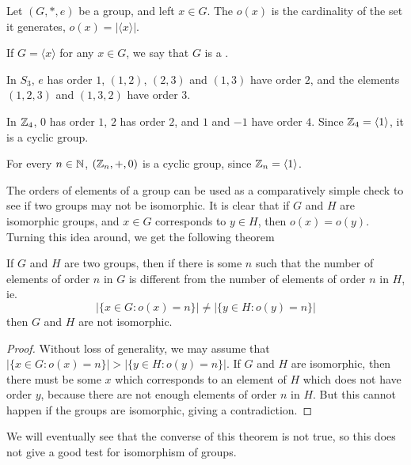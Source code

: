 \begin{definition}
  Let $(G, \ast, e)$ be a group, and left $x \in G$.  The
   $o(x)$ is the cardinality of the set it
  generates, $o(x) = |\langle x \rangle|$.
  
  If $G = \langle x \rangle$ for any $x \in G$, we say that $G$ is a
  .
\end{definition}

\begin{example}
  In $S_{3}$, $e$ has order $1$, $(1,2)$, $(2,3)$ and $(1,3)$ have order $2$,
  and the elements $(1,2,3)$ and $(1,3,2)$ have order $3$.
  
  In $\mathbb{Z}_{4}$, $0$ has order $1$, $2$ has order $2$, and $1$ and $-1$
  have order $4$.  Since $\mathbb{Z}_{4} = \langle 1 \rangle$, it is a cyclic
  group.
\end{example}

\begin{example}
  For every $n \in \mathbb{N}$, $(\mathbb{Z}_{n}, +, 0)$ is a cyclic group,
  since $\mathbb{Z}_{n} = \langle 1 \rangle$.
\end{example}

The orders of elements of a group can be used as a comparatively 
simple check to see if two groups may not be isomorphic.  It is clear 
that if $G$ and $H$ are isomorphic groups, and $x \in G$ corresponds to 
$y \in H$, then $o(x) = o(y)$.  Turning this idea around, we get the 
following theorem

\begin{theorem}
    If $G$ and $H$ are two groups, then if there is some $n$ such that
    the number of elements of order $n$ in $G$ is different from the
    number of elements of order $n$ in $H$, ie.
    \[
      |\{x \in G : o(x) = n\}| \ne |\{y \in H : o(y) = n\}|
    \]
    then $G$ and $H$ are not isomorphic.
\end{theorem}
\begin{proof}
    Without loss of generality, we may assume that $|\{x \in G : o(x) = 
    n\}| > |\{y \in H : o(y) = n\}|$.  If $G$ and $H$ are isomorphic, 
    then there must be some $x$ which corresponds to an element of $H$ 
    which does not have order $y$, because there are not enough 
    elements of order $n$ in $H$.  But this cannot happen if the 
    groups are isomorphic, giving a contradiction.
\end{proof}

We will eventually see that the converse of this theorem is not true, 
so this does not give a good test for isomorphism of groups.


